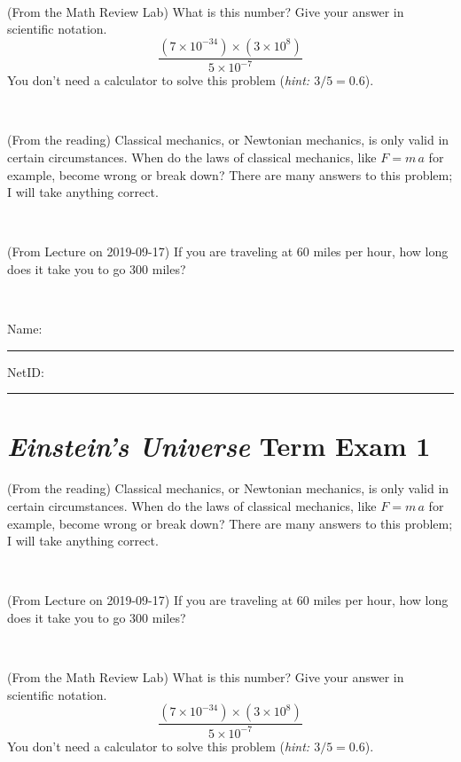 \documentclass[12pt, letterpaper]{article}
\begin{document}
\vfill ~

\begin{problem} (From the Math Review Lab)
What is this number? Give your answer in scientific notation.
$$
\frac{(7\times10^{-34})\times(3\times10^8)}{5\times10^{-7}}
$$
You don't need a calculator to solve this problem (\textit{hint: $3/5=0.6$}).
\end{problem}


\vfill ~

\begin{problem} (From the reading)
Classical mechanics, or Newtonian mechanics, is only valid in certain
circumstances. When do the laws of classical mechanics, like $F =
m\,a$ for example, become wrong or break down? There are many answers
to this problem; I will take anything correct.
\end{problem}


\vfill ~

\begin{problem} (From Lecture on 2019-09-17)
If you are traveling at 60 miles per hour, how long does
it take you to go 300 miles?
\end{problem}


\vfill ~


\cleardoublepage



\noindent
Name: \rule[-1ex]{0.60\textwidth}{0.1pt}
NetID: \rule[-1ex]{0.20\textwidth}{0.1pt}

\section*{\textsl{Einstein's Universe} Term Exam 1}
\setcounter{problem}{1}


\begin{problem} (From the reading)
Classical mechanics, or Newtonian mechanics, is only valid in certain
circumstances. When do the laws of classical mechanics, like $F =
m\,a$ for example, become wrong or break down? There are many answers
to this problem; I will take anything correct.
\end{problem}


\vfill ~

\begin{problem} (From Lecture on 2019-09-17)
If you are traveling at 60 miles per hour, how long does
it take you to go 300 miles?
\end{problem}


\vfill ~

\begin{problem} (From the Math Review Lab)
What is this number? Give your answer in scientific notation.
$$
\frac{(7\times10^{-34})\times(3\times10^8)}{5\times10^{-7}}
$$
You don't need a calculator to solve this problem (\textit{hint: $3/5=0.6$}).
\end{problem}
\end{document}
